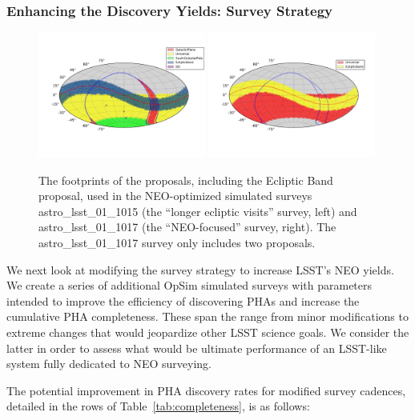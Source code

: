 \subsubsection{Enhancing the Discovery Yields: Survey Strategy}

\begin{figure}[t!]
	\centering
	\includegraphics[width=0.49\textwidth]{figures/astro_lsst_01_1015_proposal_footprint}
	\includegraphics[width=0.49\textwidth]{figures/astro_lsst_01_1017_proposal_footprint}
	\vskip -0.5in
	\caption{The footprints of the proposals, including the Ecliptic Band proposal, used in the NEO-optimized simulated surveys astro\_lsst\_01\_1015 (the ``longer ecliptic visits'' survey, left) and astro\_lsst\_01\_1017 (the ``NEO-focused'' survey, right). The astro\_lsst\_01\_1017 survey only includes two proposals.
		\label{fig:neo_footprints}}
\end{figure}

We next look at modifying the survey strategy to increase LSST's NEO yields. We create a series of additional OpSim simulated surveys with parameters intended to improve the efficiency of discovering PHAs and increase the cumulative PHA completeness. These span the range from minor modifications to extreme changes that would jeopardize other LSST science goals. We consider the latter in order to assess what would be ultimate performance of an LSST-like system fully dedicated to NEO surveying.

The potential improvement in PHA discovery rates for modified survey cadences,
detailed in the rows of Table~\ref{tab:completeness}, is as follows:


